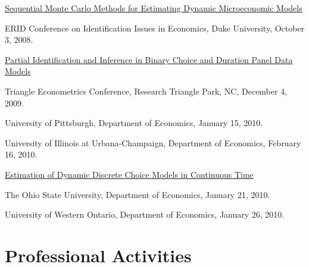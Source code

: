 \documentclass[10pt,letterpaper]{article}
\renewenvironment{itemize}{
  \begin{list}{}{
    \setlength{\leftmargin}{1.5em}
    \setlength{\itemsep}{0.25em}
    \setlength{\parskip}{0pt}
    \setlength{\parsep}{0.25em}
  }
}{
  \end{list}
}
\begin{document}
\begin{itemize}

\item \href{http://jblevins.org/research/smcdmm}{Sequential Monte Carlo Methods for Estimating Dynamic Microeconomic Models}

  \begin{itemize}

  \item ERID Conference on Identification Issues in Economics,
    Duke University, October 3, 2008.

  \end{itemize}

\item \href{http://jblevins.org/research/panel}{Partial Identification and Inference in Binary Choice and Duration
    Panel Data Models}

  \begin{itemize}

  \item Triangle Econometrics Conference, Research Triangle Park, NC,
    December 4, 2009.

  \item University of Pittsburgh, Department of Economics,
    January 15, 2010.

  \item University of Illinois at Urbana-Champaign, Department of Economics,
    February 16, 2010.

  \end{itemize}

\item \href{http://jblevins.org/research/abbe}{Estimation of Dynamic Discrete Choice Models in Continuous Time}

  \begin{itemize}

  \item The Ohio State University, Department of Economics,
    January 21, 2010.

  \item University of Western Ontario, Department of Economics,
    January 26, 2010.

  \end{itemize}

\end{itemize}

\section*{Professional Activities}
\end{document}
